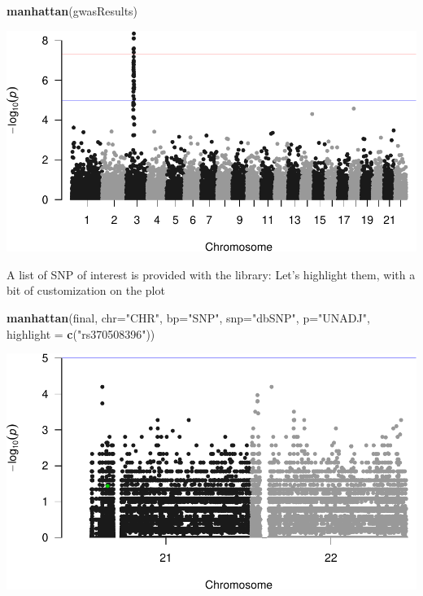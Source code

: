 \documentclass[
]{article}
\newenvironment{Shaded}{\begin{snugshade}}{\end{snugshade}}
\newcommand{\DataTypeTok}[1]{\textcolor[rgb]{0.13,0.29,0.53}{#1}}
\newcommand{\KeywordTok}[1]{\textcolor[rgb]{0.13,0.29,0.53}{\textbf{#1}}}
\newcommand{\NormalTok}[1]{#1}
\newcommand{\StringTok}[1]{\textcolor[rgb]{0.31,0.60,0.02}{#1}}
\begin{document}
\begin{Shaded}
\begin{Highlighting}[]
\KeywordTok{manhattan}\NormalTok{(gwasResults)}
\end{Highlighting}
\end{Shaded}

\includegraphics{GWASvisualizations_files/figure-latex/unnamed-chunk-10-2.pdf}

A list of SNP of interest is provided with the library: Let's highlight
them, with a bit of customization on the plot

\begin{Shaded}
\begin{Highlighting}[]
\KeywordTok{manhattan}\NormalTok{(final,  }\DataTypeTok{chr=}\StringTok{"CHR"}\NormalTok{, }\DataTypeTok{bp=}\StringTok{"SNP"}\NormalTok{, }\DataTypeTok{snp=}\StringTok{"dbSNP"}\NormalTok{, }\DataTypeTok{p=}\StringTok{"UNADJ"}\NormalTok{, }\DataTypeTok{highlight =} \KeywordTok{c}\NormalTok{(}\StringTok{"rs370508396"}\NormalTok{))}
\end{Highlighting}
\end{Shaded}

\includegraphics{GWASvisualizations_files/figure-latex/unnamed-chunk-11-1.pdf}
\end{document}
